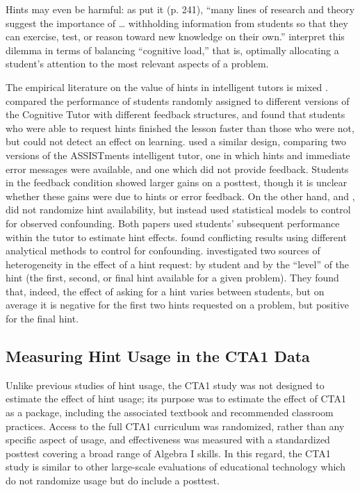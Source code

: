 \documentclass{article}\usepackage[]{graphicx}\usepackage[]{color}
\begin{document}
Hints may even be harmful: as \citet{koedinger2007exploring} put it
(p. 241),
``many lines of research and theory suggest the importance of \dots
withholding information from students so that they can exercise, test,
or reason toward new knowledge on their own.''
\citet{paas1994variability} interpret this dilemma in terms of balancing
``cognitive load,'' that is, optimally allocating a student's
attention to the most relevant aspects of a problem.

The empirical literature on the value of hints in intelligent tutors
is mixed \citep[see][for a summary]{goldin2012learner}.
\citet{anderson1995cognitive} compared the performance of students
randomly assigned to different versions of the Cognitive Tutor with
different feedback structures, and found that students who were able
to request hints finished the lesson faster than those who were not,
but could not detect an effect on learning.
\citet{singh2011feedback} used a similar design, comparing two
versions of the ASSISTments intelligent tutor, one in which hints and
immediate error messages were available, and one which did not provide
feedback. Students in the feedback condition showed larger gains on a
posttest, though it is unclear whether these gains were due to hints
or error feedback.
On the other hand, \citet{beck2008does} and \citet{goldin2012learner}, did not randomize hint
availability, but instead used statistical models to control for
observed confounding.
Both papers used students' subsequent performance within the tutor to
estimate hint effects.
\citet{beck2008does} found conflicting results using different
analytical methods to control for confounding.
\citet{goldin2012learner} investigated two sources of heterogeneity in
the effect of a hint request: by student and by the ``level'' of the
hint (the first, second, or final hint available for a given problem).
They found that, indeed, the effect of asking for a hint varies
between students, but on average it is negative for the first two
hints requested on a problem, but positive for the final hint.

\subsection{Measuring Hint Usage in the CTA1 Data}
Unlike previous studies of hint usage, the CTA1 study was not designed
to estimate the effect of hint usage; its purpose was to estimate the
effect of CTA1 as a package, including the associated textbook and
recommended classroom practices.
Access to the full CTA1 curriculum was randomized, rather than any
specific aspect of usage, and effectiveness was measured with a
standardized posttest covering a broad range of Algebra I skills.
In this regard, the CTA1 study is similar to other large-scale
evaluations of educational technology which do not randomize usage but
do include a posttest.
\end{document}
